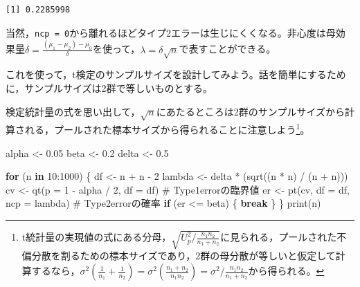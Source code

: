 \documentclass[
  a4paper,
]{ltjsbook}
\newenvironment{Shaded}{\begin{snugshade}}{\end{snugshade}}
\newcommand{\AttributeTok}[1]{\textcolor[rgb]{0.40,0.45,0.13}{#1}}
\newcommand{\CommentTok}[1]{\textcolor[rgb]{0.37,0.37,0.37}{#1}}
\newcommand{\ControlFlowTok}[1]{\textcolor[rgb]{0.00,0.23,0.31}{\textbf{#1}}}
\newcommand{\DecValTok}[1]{\textcolor[rgb]{0.68,0.00,0.00}{#1}}
\newcommand{\FloatTok}[1]{\textcolor[rgb]{0.68,0.00,0.00}{#1}}
\newcommand{\FunctionTok}[1]{\textcolor[rgb]{0.28,0.35,0.67}{#1}}
\newcommand{\NormalTok}[1]{\textcolor[rgb]{0.00,0.23,0.31}{#1}}
\newcommand{\OtherTok}[1]{\textcolor[rgb]{0.00,0.23,0.31}{#1}}
\newcommand{\SpecialCharTok}[1]{\textcolor[rgb]{0.37,0.37,0.37}{#1}}
\begin{document}
\begin{verbatim}
[1] 0.2285998
\end{verbatim}

当然，\texttt{ncp\ =\ 0}から離れるほどタイプ2エラーは生じにくくなる。非心度は母効果量\(\delta = \frac{(\mu_1 - \mu_2)-\mu_0}{\delta}\)を使って，\(\lambda = \delta \sqrt{n}\)で表すことができる。

これを使って，t検定のサンプルサイズを設計してみよう。話を簡単にするために，サンプルサイズは2群で等しいものとする。

検定統計量の式を思い出して，\(\sqrt{n}\)にあたるところは2群のサンプルサイズから計算される，プールされた標本サイズから得られることに注意しよう\footnote{t統計量の実現値の式にある分母，\(\sqrt{U_p^2/\frac{n_1n_2}{n_1+n_2}}\)に見られる，プールされた不偏分散を割るための標本サイズであり，2群の母分散が等しいと仮定して計算するなら，\(\sigma^2(\frac{1}{n_1} + \frac{1}{n_2}) = \sigma^2(\frac{n_1+n_2}{n_1n_2}) = \sigma^2 / \frac{n_1n_2}{n_1 + n_2}\)から得られる。}。

\begin{Shaded}
\begin{Highlighting}[]
\NormalTok{alpha }\OtherTok{\textless{}{-}} \FloatTok{0.05}
\NormalTok{beta }\OtherTok{\textless{}{-}} \FloatTok{0.2}
\NormalTok{delta }\OtherTok{\textless{}{-}} \FloatTok{0.5}

\ControlFlowTok{for}\NormalTok{ (n }\ControlFlowTok{in} \DecValTok{10}\SpecialCharTok{:}\DecValTok{1000}\NormalTok{) \{}
\NormalTok{  df }\OtherTok{\textless{}{-}}\NormalTok{ n }\SpecialCharTok{+}\NormalTok{ n }\SpecialCharTok{{-}} \DecValTok{2}
\NormalTok{  lambda }\OtherTok{\textless{}{-}}\NormalTok{ delta }\SpecialCharTok{*}\NormalTok{ (}\FunctionTok{sqrt}\NormalTok{((n }\SpecialCharTok{*}\NormalTok{ n) }\SpecialCharTok{/}\NormalTok{ (n }\SpecialCharTok{+}\NormalTok{ n)))}
\NormalTok{  cv }\OtherTok{\textless{}{-}} \FunctionTok{qt}\NormalTok{(}\AttributeTok{p =} \DecValTok{1} \SpecialCharTok{{-}}\NormalTok{ alpha }\SpecialCharTok{/} \DecValTok{2}\NormalTok{, }\AttributeTok{df =}\NormalTok{ df) }\CommentTok{\# Type1errorの臨界値}
\NormalTok{  er }\OtherTok{\textless{}{-}} \FunctionTok{pt}\NormalTok{(cv, }\AttributeTok{df =}\NormalTok{ df, }\AttributeTok{ncp =}\NormalTok{ lambda) }\CommentTok{\# Type2errorの確率}
  \ControlFlowTok{if}\NormalTok{ (er }\SpecialCharTok{\textless{}=}\NormalTok{ beta) \{}
    \ControlFlowTok{break}
\NormalTok{  \}}
\NormalTok{\}}
\FunctionTok{print}\NormalTok{(n)}
\end{Highlighting}
\end{Shaded}
\end{document}
